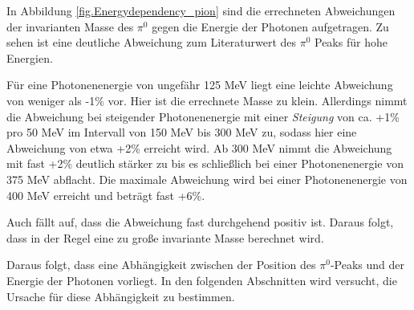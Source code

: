 \documentclass[a4paper,11pt,oneside,final,german,openbib,pdftex]{scrbook}
\begin{document}
{In Abbildung \ref{fig.Energydependency_pion} sind die errechneten Abweichungen der invarianten Masse des $\pi^0$ gegen die Energie der Photonen aufgetragen. Zu sehen ist eine deutliche Abweichung zum Literaturwert des $\pi^0$ Peaks für hohe Energien. 

F\"ur eine Photonenenergie von ungef\"ahr 125 MeV liegt eine leichte Abweichung von weniger als -1\% vor. Hier ist die errechnete Masse zu klein. Allerdings nimmt die Abweichung bei steigender Photonenenergie mit einer \textit{Steigung} von ca. +1\% pro 50 MeV im Intervall von 150 MeV bis 300 MeV zu, sodass hier eine Abweichung von etwa +2\% erreicht wird. Ab 300 MeV nimmt die Abweichung mit fast +2\% deutlich st\"arker zu bis es schlie{\ss}lich bei einer Photonenenergie von 375 MeV abflacht. Die maximale Abweichung wird bei einer Photonenenergie von 400 MeV erreicht und betr\"agt fast +6\%.



Auch fällt auf, dass die Abweichung fast durchgehend positiv ist. Daraus folgt, dass in der Regel eine zu gro{\ss}e invariante Masse berechnet wird.
  
Daraus folgt, dass eine Abhängigkeit zwischen der Position des $\pi^0$-Peaks und der Energie der Photonen vorliegt. 
In den folgenden Abschnitten wird versucht, die Ursache für diese Abhängigkeit zu bestimmen.





}
\end{document}
